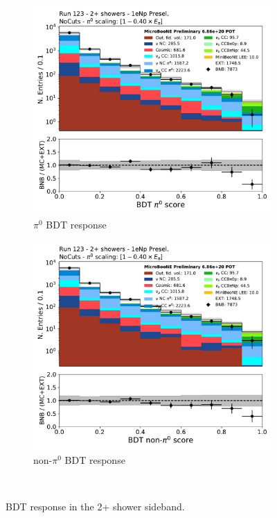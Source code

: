 \begin{figure}[H]
    \begin{center}
    \begin{subfigure}{0.45\textwidth}
    \includegraphics[width=1.00\textwidth]{Sidebands/Figures/1eNp/TwoShower/TwoPShr_NP_None_pi0e040/pi0_score_log.pdf}
    \caption{\npsel $\pi^0$ BDT response}
    \end{subfigure}
    \begin{subfigure}{0.45\textwidth}
    \includegraphics[width=1.00\textwidth]{Sidebands/Figures/1eNp/TwoShower/TwoPShr_NP_None_pi0e040/nonpi0_score_log.pdf}
    \caption{\npsel non-$\pi^0$ BDT response}
    \end{subfigure} \\
    \caption{\label{fig:sb:1eNp:twopshr:BDT} BDT response in the 2+ shower sideband.}
    \end{center}
\end{figure}


